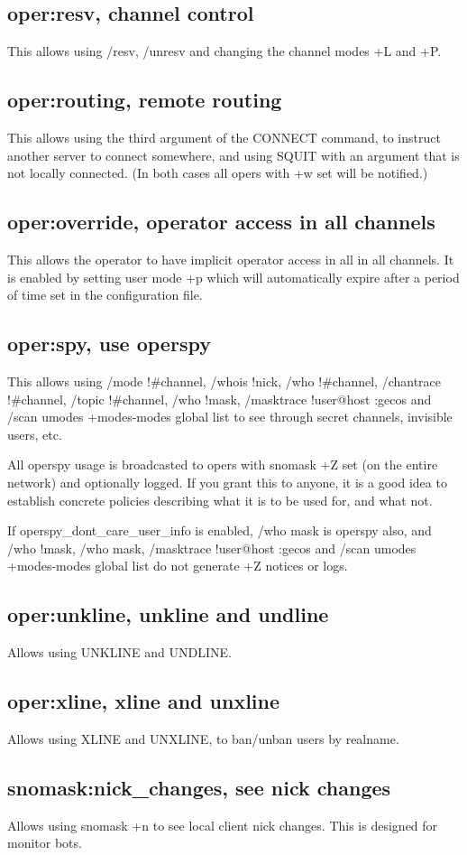 
\subsection{oper:resv, channel control}
	This allows using /resv, /unresv and changing the channel modes +L and
	+P.

\subsection{oper:routing, remote routing}
	This allows using the third argument of the CONNECT command, to
	instruct another server to connect somewhere, and using SQUIT with an
	argument that is not locally connected. (In both cases all opers with
	+w set will be notified.)

\subsection{oper:override, operator access in all channels}
	This allows the operator to have implicit operator access in all
	in all channels. It is enabled by setting user mode +p which
	will automatically expire after a period of time set in the
	configuration file.

\subsection{oper:spy, use operspy}
	This allows using /mode !\#channel, /whois !nick, /who !\#channel,
	/chantrace !\#channel, /topic !\#channel, /who !mask, /masktrace
	!user@host :gecos and /scan umodes +modes-{}modes global list to see
	through secret channels, invisible users, etc.

	All operspy usage is broadcasted to opers with snomask +Z set (on the
	entire network) and optionally logged. If you grant this to anyone, it
	is a good idea to establish concrete policies describing what it is to
	be used for, and what not.

	If operspy\_dont\_care\_user\_info is enabled, /who mask is operspy
	also, and /who !mask, /who mask, /masktrace !user@host :gecos and
	/scan umodes +modes-{}modes global list do not generate +Z notices or
	logs.

\subsection{oper:unkline, unkline and undline}
	Allows using UNKLINE and UNDLINE.

\subsection{oper:xline, xline and unxline}
	Allows using XLINE and UNXLINE, to ban/unban users by realname.

\subsection{snomask:nick\_changes, see nick changes}
	Allows using snomask +n to see local client nick changes. This is
	designed for monitor bots.
